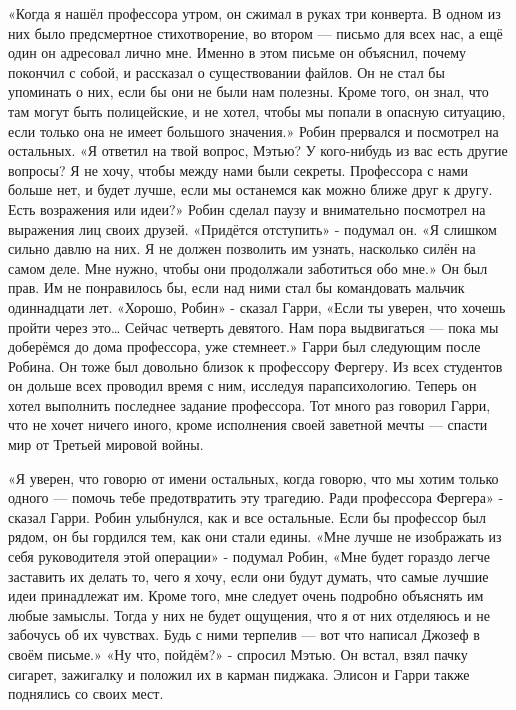\documentclass[a4paper,12pt]{book}
\begin{document}
	«Когда я нашёл профессора утром, он сжимал в руках три конверта. В одном из них было предсмертное стихотворение, во втором — письмо для всех нас, а ещё один он адресовал лично мне. Именно в этом письме он объяснил, почему покончил с собой, и рассказал о существовании файлов. Он не стал бы упоминать о них, если бы они не были нам полезны. Кроме того, он знал, что там могут быть полицейские, и не хотел, чтобы мы попали в опасную ситуацию, если только она не имеет большого значения.»
	Робин прервался и посмотрел на остальных.
	«Я ответил на твой вопрос, Мэтью? У кого-нибудь из вас есть другие вопросы? Я не хочу, чтобы между нами были секреты. Профессора с нами больше нет, и будет лучше, если мы останемся как можно ближе друг к другу. Есть возражения или идеи?»
	Робин сделал паузу и внимательно посмотрел на выражения лиц своих друзей.
	«Придётся отступить» - подумал он.
	«Я слишком сильно давлю на них. Я не должен позволить им узнать, насколько силён на самом деле. Мне нужно, чтобы они продолжали заботиться обо мне.»
	Он был прав. Им не понравилось бы, если над ними стал бы командовать мальчик одиннадцати лет. 
	«Хорошо, Робин» - сказал Гарри,
	«Если ты уверен, что хочешь пройти через это… Сейчас четверть девятого. Нам пора выдвигаться — пока мы доберёмся до дома профессора, уже стемнеет.»
	Гарри был следующим после Робина. Он тоже был довольно близок к профессору Фергеру. Из всех студентов он дольше всех проводил время с ним, исследуя парапсихологию. Теперь он хотел выполнить последнее задание профессора. Тот много раз говорил Гарри, что не хочет ничего иного, кроме исполнения своей заветной мечты — спасти мир от Третьей мировой войны.

	«Я уверен, что говорю от имени остальных, когда говорю, что мы хотим только одного — помочь тебе предотвратить эту трагедию. Ради профессора Фергера» - сказал Гарри.
	Робин улыбнулся, как и все остальные. Если бы профессор был рядом, он бы гордился тем, как они стали едины.
	«Мне лучше не изображать из себя руководителя этой операции» - подумал Робин,
	«Мне будет гораздо легче заставить их делать то, чего я хочу, если они будут думать, что самые лучшие идеи принадлежат им. Кроме того, мне следует очень подробно объяснять им любые замыслы. Тогда у них не будет ощущения, что я от них отделяюсь и не забочусь об их чувствах. Будь с ними терпелив — вот что написал Джозеф в своём письме.»
	«Ну что, пойдём?» - спросил Мэтью. Он встал, взял пачку сигарет, зажигалку и положил их в карман пиджака. Элисон и Гарри также поднялись со своих мест.
\end{document}
